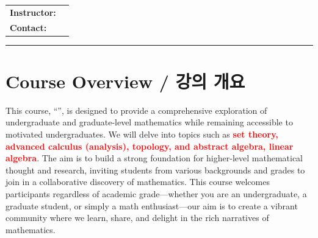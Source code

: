 	
	\maketitle
	\thispagestyle{fancy}
	\begin{center}
	\begin{tabular}{l l}
		\textbf{Instructor:} & \Instructor \\
		\textbf{Contact:} & \ContactInfo \\
	\end{tabular}
	\end{center}
	\vspace{2em}
	\begin{center}
		\rule{\textwidth}{0.5pt}
	\end{center}
	\section*{Course Overview / 강의 개요}
	This course, ``\emph{\CourseTitle}'', is designed to provide a comprehensive exploration of undergraduate and graduate-level mathematics while remaining accessible to motivated undergraduates. We will delve into topics such as \textcolor{red}{\bfseries set theory, advanced calculus (analysis), topology, and abstract algebra, linear algebra}. The aim is to build a strong foundation for higher-level mathematical thought and research, inviting students from various backgrounds and grades to join in a collaborative discovery of mathematics. This course welcomes participants regardless of academic grade—whether you are an undergraduate, a graduate student, or simply a math enthusiast—our aim is to create a vibrant community where we learn, share, and delight in the rich narratives of mathematics. 	
	\bigskip	
	
